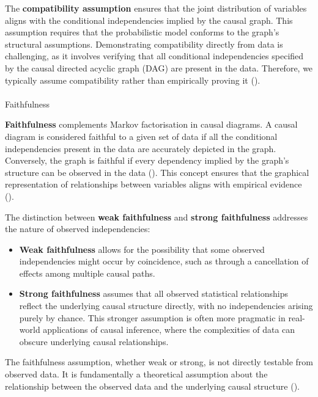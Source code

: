 \documentclass[
  single column]{article}
\makeatletter
\let\oldparagraph\paragraph
\renewcommand{\paragraph}{
    \@ifstar
      \xxxParagraphStar
      \xxxParagraphNoStar
  }
\newcommand{\xxxParagraphStar}[1]{\oldparagraph*{#1}\mbox{}}
\newcommand{\xxxParagraphNoStar}[1]{\oldparagraph{#1}\mbox{}}
\providecommand{\tightlist}{%
  \setlength{\itemsep}{0pt}\setlength{\parskip}{0pt}}\usepackage{longtable,booktabs,array}
\makeatother
\begin{document}
The \textbf{compatibility assumption} ensures that the joint
distribution of variables aligns with the conditional independencies
implied by the causal graph. This assumption requires that the
probabilistic model conforms to the graph's structural assumptions.
Demonstrating compatibility directly from data is challenging, as it
involves verifying that all conditional independencies specified by the
causal directed acyclic graph (DAG) are present in the data. Therefore,
we typically assume compatibility rather than empirically proving it
().

\paragraph{Faithfulness}\label{faithfulness}

\textbf{Faithfulness} complements Markov factorisation in causal
diagrams. A causal diagram is considered faithful to a given set of data
if all the conditional independencies present in the data are accurately
depicted in the graph. Conversely, the graph is faithful if every
dependency implied by the graph's structure can be observed in the data
(). This concept
ensures that the graphical representation of relationships between
variables aligns with empirical evidence
().

The distinction between \textbf{weak faithfulness} and \textbf{strong
faithfulness} addresses the nature of observed independencies:

\begin{itemize}
\tightlist
\item
  \textbf{Weak faithfulness} allows for the possibility that some
  observed independencies might occur by coincidence, such as through a
  cancellation of effects among multiple causal paths.
\item
  \textbf{Strong faithfulness} assumes that all observed statistical
  relationships reflect the underlying causal structure directly, with
  no independencies arising purely by chance. This stronger assumption
  is often more pragmatic in real-world applications of causal
  inference, where the complexities of data can obscure underlying
  causal relationships.
\end{itemize}

The faithfulness assumption, whether weak or strong, is not directly
testable from observed data. It is fundamentally a theoretical
assumption about the relationship between the observed data and the
underlying causal structure ().
\end{document}
